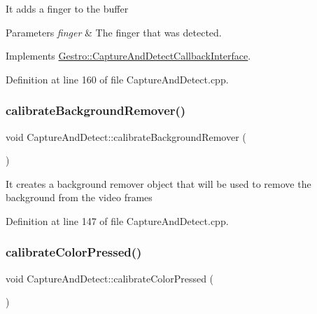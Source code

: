 It adds a finger to the buffer


\begin{DoxyParams}{Parameters}
{\em finger} & The finger that was detected. \\
\hline
\end{DoxyParams}


Implements \hyperlink{class_gestro_1_1_capture_and_detect_callback_interface_a8397891f6177ba6257e9cc978d9ddd52}{Gestro\+::\+Capture\+And\+Detect\+Callback\+Interface}.



Definition at line 160 of file Capture\+And\+Detect.\+cpp.

\mbox{\label{class_gestro_1_1_capture_and_detect_a53065abfb6eed6c074ad4d3370b3f232}} 
\subsubsection{\texorpdfstring{calibrate\+Background\+Remover()}{calibrateBackgroundRemover()}}
{\footnotesize\ttfamily void Capture\+And\+Detect\+::calibrate\+Background\+Remover (\begin{DoxyParamCaption}{ }\end{DoxyParamCaption})}

It creates a background remover object that will be used to remove the background from the video frames 

Definition at line 147 of file Capture\+And\+Detect.\+cpp.

\mbox{\label{class_gestro_1_1_capture_and_detect_ac60f9b1d192c043fa9b40c38fc5599e6}} 
\subsubsection{\texorpdfstring{calibrate\+Color\+Pressed()}{calibrateColorPressed()}}
{\footnotesize\ttfamily void Capture\+And\+Detect\+::calibrate\+Color\+Pressed (\begin{DoxyParamCaption}{ }\end{DoxyParamCaption})}

